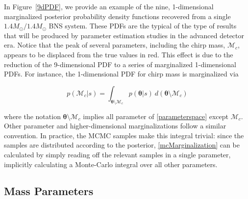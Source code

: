 \documentclass[11pt,a4paper]{emulateapj}
\newcommand{\thpara}{\boldsymbol{\theta}}
\newcommand{\chmass}{\mathcal{M}_c}
\begin{document}
In Figure~\ref{9dPDF}, we provide an example of the nine, 1-dimensional marginalized posterior 
probability density functions recovered from a single $1.4M_{\odot}/1.4M_{\odot}$ BNS system. 
 These PDFs are the typical of the type of results that will be produced by parameter estimation
  studies in the advanced  detector era.  Notice that the peak of several parameters, including the 
  chirp mass, $\chmass$,  appears to be displaced from the true values in red.  This effect is due to 
  the reduction of the  9-dimensional PDF to a series of marginalized 1-dimensional PDFs. 
   For instance, the 1-dimensional PDF for chirp mass is marginalized via

\begin{equation}
p(\chmass | s) = \int _{\thpara \setminus \chmass} p(\thpara | s)~d(\thpara \setminus \chmass)
\label{mcMarginalization}
\end{equation}

\noindent where the notation $\thpara \setminus \chmass$ implies all
parameter of \eqref{parameterspace} except $\chmass$.  Other parameter and higher-dimensional marginalizations follow
 a similar convention.  In practice, the MCMC samples make this integral trivial: since the samples are distributed according 
to the posterior, \eqref{mcMarginalization} can be calculated by simply reading off the relevant samples in a single parameter, 
implicitly calculating a Monte-Carlo integral over all other parameters.



\subsection{Mass Parameters}
\label{massSection}
\end{document}
